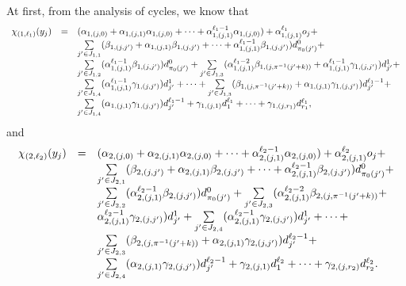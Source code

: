 At first, from the analysis of cycles, we know that
\[
\begin{array}{l c l}
\chi_{(1,\ell_1)}(y_j)  & = & (\alpha_{1,(j,0)} + \alpha_{1,(j,1)} \alpha_{1,(j,0)}+ \dots +\alpha^{\ell_1-1}_{1,(j,1)} \alpha_{1,(j,0)}) + \alpha^{\ell_1}_{1,(j,1)} o_j + \\
& & \sum \limits_{j' \in J_{1,1}} (\beta_{1,(j,j')}+\alpha_{1,(j,1)}\beta_{1,(j,j')} + \dots +\alpha^{\ell_1-1}_{1,(j,1)}  \beta_{1,(j,j')}) d^0_{\pi_0(j')} + \\
%
& & \sum \limits_{j' \in J_{1,2}} (\alpha^{\ell_1-1}_{1,(j,1)}\beta_{1,(j,j')}) d^0_{\pi_0(j')} +  \sum \limits_{j' \in J_{1,3}} (\alpha^{\ell_1-2}_{1,(j,1)}\beta_{1,(j, \pi^{-1}(j'+k))}+\alpha^{\ell_1-1}_{1,(j,1)}\gamma_{1,(j,j')}) d^1_{j'} + \\
%
& & \sum \limits_{j' \in J_{1,4}} (\alpha^{\ell_1-1}_{1,(j,1)} \gamma_{1,(j,j')}) d^1_{j'} + \dots + \sum \limits_{j' \in J_{1,3}} (\beta_{1,(j, \pi^{-1}(j'+k))}+\alpha_{1,(j,1)}\gamma_{1,(j,j')}) d^{\ell_1-1}_{j'} + \\
%
& & \sum \limits_{j' \in J_{1,4}} (\alpha_{1,(j,1)} \gamma_{1,(j,j')}) d^{\ell_1-1}_{j'} + \gamma_{1,(j, 1)} d^{\ell_1}_{1} + \dots + \gamma_{1,(j,r_1)} d^{\ell_1}_{r_1},
\end{array} 
\]
and
\[
\begin{array}{l c l}
\chi_{(2,\ell_2)}(y_j)  & = & (\alpha_{2,(j,0)} + \alpha_{2,(j,1)} \alpha_{2,(j,0)}+ \dots +\alpha^{\ell_2-1}_{2,(j,1)} \alpha_{2,(j,0)}) + \alpha^{\ell_2}_{2,(j,1)} o_j + \\
%
& & \sum \limits_{j' \in J_{2,1}} (\beta_{2,(j,j')}+\alpha_{2,(j,1)}\beta_{2,(j,j')} + \dots +\alpha^{\ell_2-1}_{2,(j,1)}  \beta_{2,(j,j')}) d^0_{\pi_0(j')} + \\
%
& & \sum \limits_{j' \in J_{2,2}} (\alpha^{\ell_2-1}_{2,(j,1)}\beta_{2,(j,j')}) d^0_{\pi_0(j')} +  \sum \limits_{j' \in J_{2,3}} (\alpha^{\ell_2-2}_{2,(j,1)}\beta_{2,(j, \pi^{-1}(j'+k))}+\\
%
& & \alpha^{\ell_2-1}_{2,(j,1)}\gamma_{2,(j,j')}) d^1_{j'} +  \sum \limits_{j' \in J_{2,4}} (\alpha^{\ell_2-1}_{2,(j,1)} \gamma_{2,(j,j')}) d^1_{j'} + \dots + \\
%
& & \sum \limits_{j' \in J_{2,3}} (\beta_{2,(j, \pi^{-1}(j'+k))}+ \alpha_{2,(j,1)}\gamma_{2,(j,j')}) d^{\ell_2-1}_{j'} + \\
%
& &  \sum \limits_{j' \in J_{2,4}} (\alpha_{2,(j,1)} \gamma_{2,(j,j')}) d^{\ell_2-1}_{j'} + \gamma_{2,(j, 1)} d^{\ell_2}_{1} +  \dots + \gamma_{2,(j,r_2)} d^{\ell_2}_{r_2}.
\end{array} 
\]

